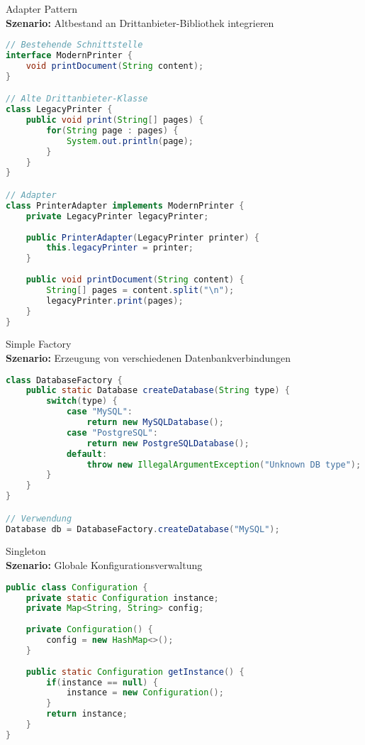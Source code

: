\begin{example}{Adapter Pattern}\\
\textbf{Szenario:} Altbestand an Drittanbieter-Bibliothek integrieren
\begin{lstlisting}[language=Java, style=base] 
// Bestehende Schnittstelle
interface ModernPrinter {
    void printDocument(String content);
}

// Alte Drittanbieter-Klasse
class LegacyPrinter {
    public void print(String[] pages) {
        for(String page : pages) {
            System.out.println(page);
        }
    }
}

// Adapter
class PrinterAdapter implements ModernPrinter {
    private LegacyPrinter legacyPrinter;
    
    public PrinterAdapter(LegacyPrinter printer) {
        this.legacyPrinter = printer;
    }
    
    public void printDocument(String content) {
        String[] pages = content.split("\n");
        legacyPrinter.print(pages);
    }
}
\end{lstlisting}
\end{example}

\begin{example}{Simple Factory}\\
\textbf{Szenario:} Erzeugung von verschiedenen Datenbankverbindungen
\begin{lstlisting}[language=Java, style=base]
class DatabaseFactory {
    public static Database createDatabase(String type) {
        switch(type) {
            case "MySQL":
                return new MySQLDatabase();
            case "PostgreSQL":
                return new PostgreSQLDatabase();
            default:
                throw new IllegalArgumentException("Unknown DB type");
        }
    }
}

// Verwendung
Database db = DatabaseFactory.createDatabase("MySQL");
\end{lstlisting}
\end{example}

\begin{example}{Singleton}\\
\textbf{Szenario:} Globale Konfigurationsverwaltung
\begin{lstlisting}[language=Java, style=base]
public class Configuration {
    private static Configuration instance;
    private Map<String, String> config;
    
    private Configuration() {
        config = new HashMap<>();
    }
    
    public static Configuration getInstance() {
        if(instance == null) {
            instance = new Configuration();
        }
        return instance;
    }
}
\end{lstlisting}
\end{example}

